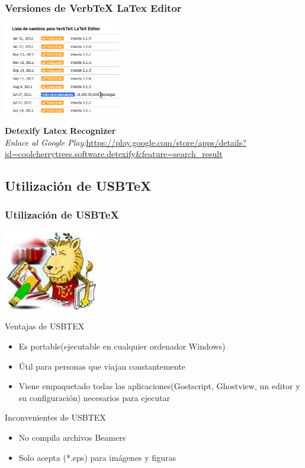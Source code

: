 \documentclass[sans serif,9pt,xcolor=dvipsnames]{beamer}%
\begin{document}
\begin{frame}
\frametitle {Versiones de VerbTeX LaTex Editor}
\begin{center}
\includegraphics[height=4cm]{imagenes/vMobil.png} 
\end{center}
\justifying
\textbf{Detexify Latex Recognizer}\\
\textit{Enlace al Google Play:}\textcolor{blue}{\url{https://play.google.com/store/apps/details?id=coolcherrytrees.software.detexify&feature=search_result }}
\end{frame}

\subsection{Utilización de USBTeX}
\begin{frame}
\frametitle {Utilización de USBTeX}
\begin{center}
\includegraphics[height=1.5 cm]{imagenes/usbtex.png} 
\end{center}
\begin{block}{Ventajas de USBTEX}
\begin{itemize}
\justifying
\item Es portable(ejecutable en cualquier ordenador Windows)
\item Útil para personas que viajan constantemente
\item Viene empaquetado todas las aplicaciones(Gostscript, Ghostview, un editor y su configuración) necesarios para ejecutar 
\end{itemize}
\end{block}

\begin{block}{Inconvenientes de USBTEX}
\begin{itemize}
\justifying
\item No compila archivos Beamers
\item Solo acepta (*.eps) para imágenes y figuras
\end{itemize}
\end{block}
\end{frame}
\end{document}
